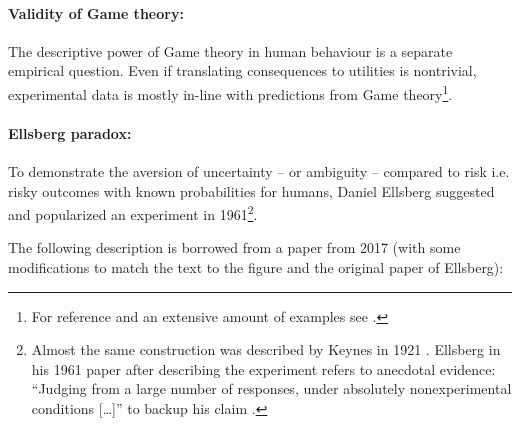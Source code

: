 \documentclass{article}
\begin{document}
\paragraph{Validity of Game theory:}
The descriptive power of Game theory in human behaviour is a separate empirical question. Even if translating consequences to utilities is nontrivial, experimental data is mostly in-line with predictions from Game theory\footnote{For reference and an extensive amount of examples see \cite{book:BehavioralGameTheory}.}.

\paragraph{Ellsberg paradox:}
To demonstrate the aversion of uncertainty -- or ambiguity -- compared to risk i.e. risky outcomes with known probabilities for humans, Daniel Ellsberg suggested and popularized an experiment in 1961\footnote{Almost the same construction was described by Keynes in 1921 \cite{book:TreatiseOnProbability}. Ellsberg in his 1961 paper after describing the experiment refers to anecdotal evidence: ``Judging from a large number of responses, under absolutely nonexperimental conditions [\dots]'' to backup his claim \cite{paper:Ellsberg1961}.}.

The following description is borrowed from a paper from 2017 (with some modifications to match the text to the figure and the original paper of Ellsberg):
\end{document}
